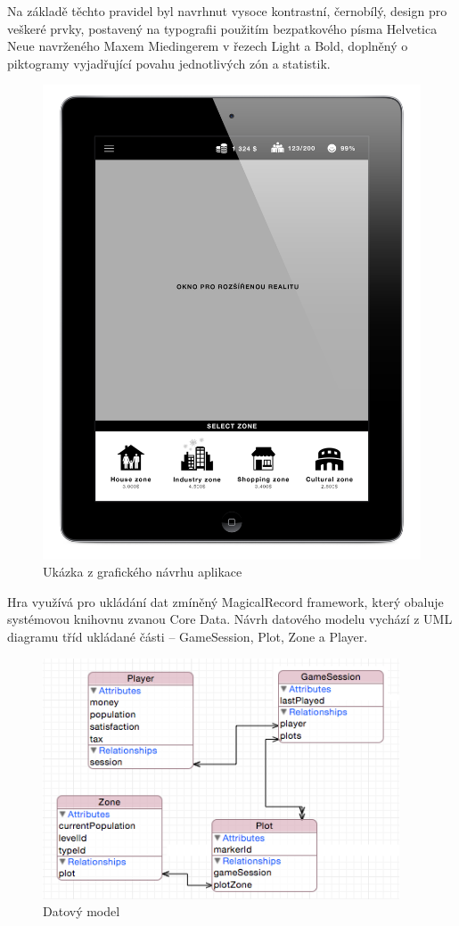 \documentclass[twoside,12pt]{article}
\begin{document}
Na základě těchto pravidel byl navrhnut vysoce kontrastní, černobílý, design pro veškeré prvky, postavený na typografii použitím bezpatkového písma Helvetica Neue navrženého Maxem Miedingerem v řezech Light a Bold, doplněný o piktogramy vyjadřující povahu jednotlivých zón a statistik.  
 
 \begin{figure}[H]
\centering
    \includegraphics[width=430px, center]{images/ipad-layout.jpg}
\captionsetup{justification=centering}
    \caption{Ukázka z grafického návrhu aplikace}
    \label{class_diagram}
\end{figure}
 
 
 Hra využívá pro ukládání dat zmíněný MagicalRecord framework, který obaluje systémovou knihovnu zvanou Core Data. Návrh datového modelu vychází z UML diagramu tříd ukládané části -- GameSession, Plot, Zone a Player.
 
 \begin{figure}[H]
\centering
    \includegraphics[width=400px, center]{images/core-data-model.png}
\captionsetup{justification=centering}
    \caption{Datový model}
    \label{class_diagram}
\end{figure}
\end{document}
